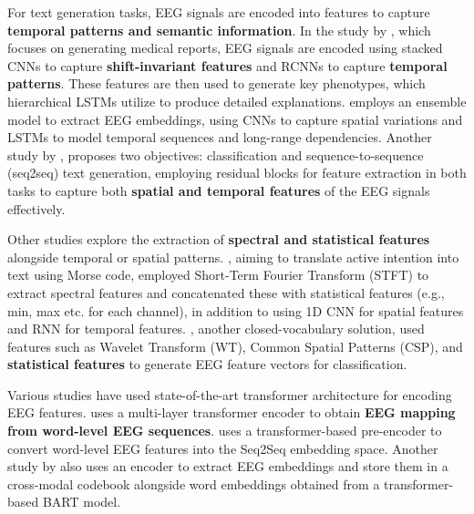 For text generation tasks, EEG signals are encoded into features to capture \textbf{temporal patterns and semantic information}. In the study by \citet{biswal2019eegtotext}, which focuses on generating medical reports, EEG signals are encoded using stacked CNNs to capture \textbf{shift-invariant features} and RCNNs to capture \textbf{temporal patterns}. These features are then used to generate key phenotypes, which hierarchical LSTMs utilize to produce detailed explanations. \citet{srivastava2020think2type} employs an ensemble model to extract EEG embeddings, using CNNs to capture spatial variations and LSTMs to model temporal sequences and long-range dependencies. Another study by \citet{yu2025decoding}, proposes two objectives: classification and sequence-to-sequence (seq2seq) text generation, employing residual blocks for feature extraction in both tasks to capture both \textbf{spatial and temporal features} of the EEG signals effectively. 

Other studies explore the extraction of \textbf{spectral and statistical features} alongside temporal or spatial patterns. \citet{yang2023thoughts}, aiming to translate active intention into text using Morse code, employed Short-Term Fourier Transform (STFT) to extract spectral features and concatenated these with statistical features (e.g., min, max etc. for each channel), in addition to using 1D CNN for spatial features and RNN for temporal features. \citet{rathod2024folded}, another closed-vocabulary solution, used features such as Wavelet Transform (WT), Common Spatial Patterns (CSP), and \textbf{statistical features} to generate EEG feature vectors for classification. 

Various studies have used state-of-the-art transformer architecture for encoding EEG features. \cite{wang2022open} uses a multi-layer transformer encoder to obtain \textbf{EEG mapping from word-level EEG sequences}. \citet{feng2023aligning} uses a transformer-based pre-encoder to convert word-level EEG features into the Seq2Seq embedding space. Another study by \citet{tao2024see} also uses an encoder to extract EEG embeddings and store them in a cross-modal codebook alongside word embeddings obtained from a transformer-based BART model. 

